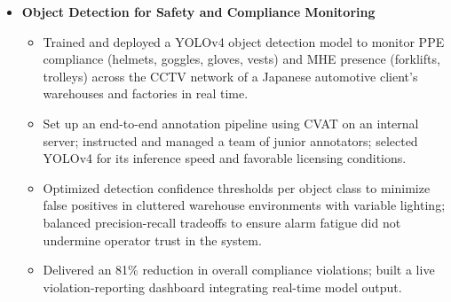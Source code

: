 \documentclass[a4paper,11pt]{article}
\begin{document}
\begin{itemize}[leftmargin=*, itemsep = -1pt]
\begin{itemize}[itemsep = -1pt]
          \item {Designed VA/NVA classification logic in collaboration with client operations teams; built shift-wise dashboards covering cycle analysis, deployment adherence, REBA/RULA ergonomics scores, and operator wise Yamazumi charts.}
          \item {Built the company-standard annotation and data-cleaning tool adopted across all productivity deployments; trained 2 junior AI engineers on the full ML pipeline; managed end-to-end client engagements across India and Japan; led 5 additional POCs for clients in India, Australia, and Dubai.}
          \item {Achieved 23\% productivity improvement and 2 FTE saved at the Indian 2-wheeler manufacturer; 100\% error elimination across 7 stations. Contributed to patent documentation for the action recognition architecture.}
        \end{itemize}\vspace{-1pt}
      \item{\textbf{Object Detection for Safety and Compliance Monitoring}}
        \begin{itemize}[itemsep = -1pt]
          \item {Trained and deployed a YOLOv4 object detection model to monitor PPE compliance (helmets, goggles, gloves, vests) and MHE presence (forklifts, trolleys) across the CCTV network of a Japanese automotive client's warehouses and factories in real time.}
          \item {Set up an end-to-end annotation pipeline using CVAT on an internal server; instructed and managed a team of junior annotators; selected YOLOv4 for its inference speed and favorable licensing conditions.}
          \item {Optimized detection confidence thresholds per object class to minimize false positives in cluttered warehouse environments with variable lighting; balanced precision-recall tradeoffs to ensure alarm fatigue did not undermine operator trust in the system.}
          \item {Delivered an 81\% reduction in overall compliance violations; built a live violation-reporting dashboard integrating real-time model output.}
        \end{itemize}\vspace{-1pt}
    \end{itemize}\vspace{-1pt}\item
\end{document}

